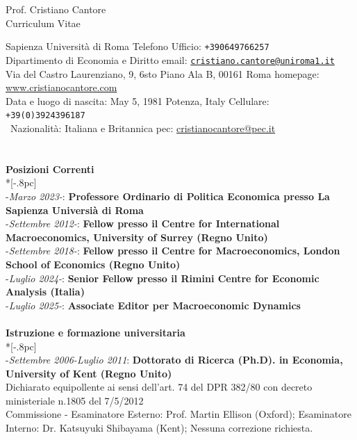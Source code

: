 \documentclass[10p]{article}
\begin{document}
\begin{center}
{\LARGE Prof. Cristiano Cantore\\ Curriculum Vitae}\\
\end{center}
Sapienza Universit\`{a} di Roma \hfill Telefono Ufficio: \texttt{+390649766257}\\
Dipartimento di Economia e Diritto \hfill email: \href{mailto:cristiano.cantore@uniroma1.it}{\nolinkurl{cristiano.cantore@uniroma1.it}} \\
Via del Castro Laurenziano, 9, 6sto Piano Ala B, 00161 Roma  \hfill homepage: 
\href{http://www.cristianocantore.com}{www.cristianocantore.com}\\
Data e luogo di nascita:  May 5, 1981 Potenza, Italy \hfill Cellulare: \texttt{ +39(0)3924396187}\\\
Nazionalit\`{a}:  Italiana e Britannica \hfill pec: \href{mailto:cristianocantore@pec.it}{cristianocantore@pec.it}\\\\
\\
{\large \bf Posizioni Correnti} \\*[-.8pc]
\underline{\hspace{6in}} \\
-\emph{Marzo 2023-}: {\bf Professore Ordinario di Politica Economica presso La Sapienza Universi\`{a} di Roma} \\
-\emph{Settembre 2012-}: {\bf Fellow presso il Centre for International Macroeconomics, University of Surrey (Regno Unito)}\\
-\emph{Settembre 2018-}: {\bf Fellow presso il Centre for Macroeconomics, London School of Economics (Regno Unito)}\\
-\emph{Luglio 2024-}: {\bf Senior Fellow presso il Rimini Centre for Economic Analysis (Italia)}\\
-\emph{Luglio 2025-}: {\bf Associate Editor per Macroeconomic Dynamics}\\
\\
{\large \bf Istruzione e formazione universitaria} \\*[-.8pc]
\underline{\hspace{6in}} \\
-\emph{Settembre 2006-Luglio 2011}: {\bf Dottorato di Ricerca (Ph.D). in Economia, University of Kent (Regno Unito)} \\
Dichiarato equipollente ai sensi dell'art. 74 del DPR 382/80 con decreto ministeriale n.1805 del 7/5/2012 \\
Commissione -  Esaminatore Esterno: Prof. Martin Ellison (Oxford); Esaminatore Interno: Dr. Katsuyuki Shibayama (Kent); Nessuna correzione richiesta. \\
\end{document}
